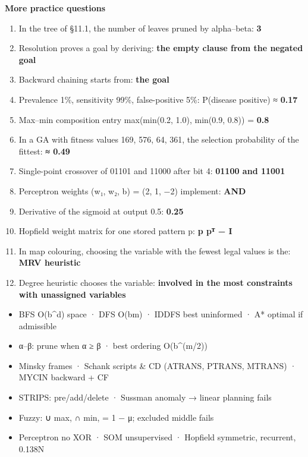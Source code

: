 \textbf{More practice questions}

\begin{enumerate}
\def\labelenumi{\arabic{enumi}.}
\setcounter{enumi}{60}
\tightlist
\item
  In the tree of §11.1, the number of leaves pruned by alpha--beta: \textbf{3}
\item
  Resolution proves a goal by deriving: \textbf{the empty clause from the negated goal}
\item
  Backward chaining starts from: \textbf{the goal}
\item
  Prevalence 1\%, sensitivity 99\%, false-positive 5\%: P(disease \textbar{} positive) ≈ \textbf{0.17}
\item
  Max--min composition entry max(min(0.2, 1.0), min(0.9, 0.8)) = \textbf{0.8}
\item
  In a GA with fitness values 169, 576, 64, 361, the selection probability of the fittest: \textbf{≈ 0.49}
\item
  Single-point crossover of 01101 and 11000 after bit 4: \textbf{01100 and 11001}
\item
  Perceptron weights (w₁, w₂, b) = (2, 1, −2) implement: \textbf{AND}
\item
  Derivative of the sigmoid at output 0.5: \textbf{0.25}
\item
  Hopfield weight matrix for one stored pattern p: \textbf{p pᵀ − I}
\item
  In map colouring, choosing the variable with the fewest legal values is the: \textbf{MRV heuristic}
\item
  Degree heuristic chooses the variable: \textbf{involved in the most constraints with unassigned variables}
\end{enumerate}

\begin{revbox}

\begin{itemize}
\tightlist
\item
  BFS O(b\^{}d) space · DFS O(bm) · IDDFS best uninformed · A* optimal if admissible
\item
  α--β: prune when α ≥ β · best ordering O(b\^{}(m/2))
\item
  Minsky frames · Schank scripts \& CD (ATRANS, PTRANS, MTRANS) · MYCIN backward + CF
\item
  STRIPS: pre/add/delete · Sussman anomaly → linear planning fails
\item
  Fuzzy: ∪ max, ∩ min, \textquotesingle{} = 1 − μ; excluded middle fails
\item
  Perceptron no XOR · SOM unsupervised · Hopfield symmetric, recurrent, 0.138N
\end{itemize}

\end{revbox}
